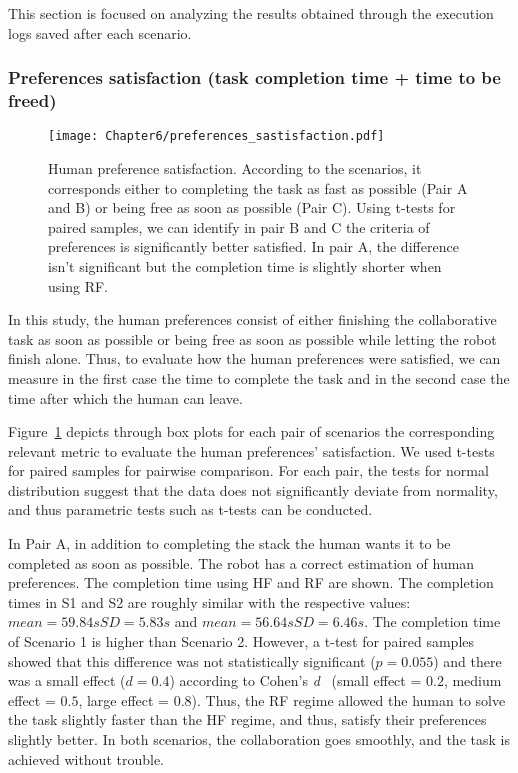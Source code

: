 This section is focused on analyzing the results obtained through the execution logs saved after each scenario. 

\subsubsection*{Preferences satisfaction (task completion time + time to be freed)}

\begin{figure}
    \center
    \texttt{[image: Chapter6/preferences\_sastisfaction.pdf]}
    \caption{Human preference satisfaction. According to the scenarios, it corresponds either to completing the task as fast as possible (Pair A and B) or being free as soon as possible (Pair C). Using t-tests for paired samples, we can identify in pair B and C the criteria of preferences is significantly better satisfied. In pair A, the difference isn't significant but the completion time is slightly shorter when using RF.}
    \label{fig:preferences_satisfaction}
\end{figure}

In this study, the human preferences consist of either finishing the collaborative task as soon as possible or being free as soon as possible while letting the robot finish alone. 
Thus, to evaluate how the human preferences were satisfied, we can measure in the first case the time to complete the task and in the second case the time after which the human can leave. 

Figure~\ref{fig:preferences_satisfaction} depicts through box plots for each pair of scenarios the corresponding relevant metric to evaluate the human preferences' satisfaction. We used t-tests for paired samples for pairwise comparison. For each pair, the tests for normal distribution suggest that the data does not significantly deviate from normality, and thus parametric tests such as t-tests can be conducted.

In Pair A, in addition to completing the stack the human wants it to be completed as soon as possible. The robot has a correct estimation of human preferences. The completion time using HF and RF are shown. The completion times in S1 and S2 are roughly similar with the respective values: $mean=59.84s SD=5.83s$ and $mean=56.64s SD=6.46s$. The completion time of Scenario 1 is higher than Scenario 2. However, a t-test for paired samples showed that this difference was not statistically significant ($p = 0.055$) and there was a small effect ($d = 0.4$) according to Cohen's \textit{d}~\cite{cohen1988concepts} (small effect = $0.2$, medium effect = $0.5$, large effect = $0.8$). Thus, the RF regime allowed the human to solve the task slightly faster than the HF regime, and thus, satisfy their preferences slightly better. 
In both scenarios, the collaboration goes smoothly, and the task is achieved without trouble.

